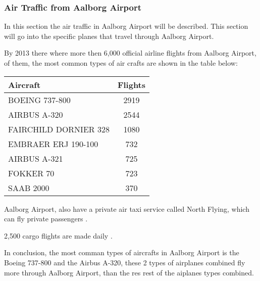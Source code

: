 \subsubsection{Air Traffic from Aalborg Airport}

In this section the air traffic in Aalborg Airport will be described. This section will go into the specific planes that travel through Aalborg Airport.


By 2013 there where more then 6,000 official airline flights from Aalborg Airport, of them, the most common types of air crafts are shown in the table below:

\begin{center}
    \begin{tabular}{ | l | c | }
        \hline
        Aircraft & Flights\\ \hline
        BOEING 737-800 & 2919\\ \hline
        AIRBUS A-320 & 2544\\ \hline
        FAIRCHILD DORNIER 328 & 1080\\ \hline
        EMBRAER ERJ 190-100 & 732\\ \hline
        AIRBUS A-321 & 725\\ \hline
        FOKKER 70 & 723\\ \hline
        SAAB 2000 & 370\\ \hline
    \end{tabular}
\end{center}


Aalborg Airport, also have a private air taxi service called North Flying, which can fly private passengers \cite{north_flying}.

2,500 cargo flights are made daily \cite{cargo_lufthavn}.

In conclusion, the most comman types of aircrafts in Aalborg Airport is the Boeing 737-800 and the Airbus A-320, these 2 types of airplanes combined fly more through Aalborg Airport, than the res rest of the aiplanes types combined.

